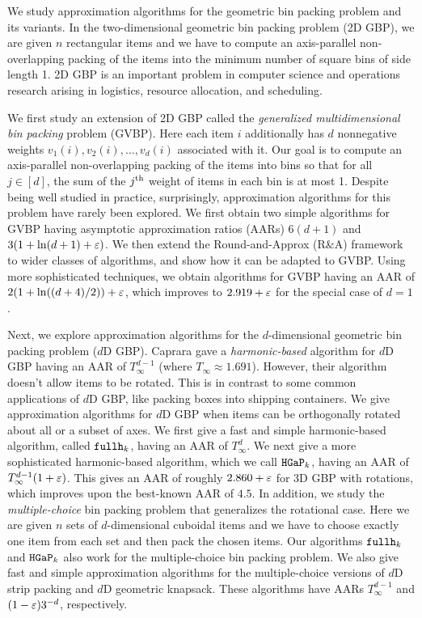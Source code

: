 We study approximation algorithms for
the geometric bin packing problem and its variants.
In the two-dimensional geometric bin packing problem (2D GBP),
we are given $n$ rectangular items and we have to compute
an axis-parallel non-overlapping packing
of the items into the minimum number of square bins of side length 1.
2D GBP is an important problem in computer science and operations research
arising in logistics, resource allocation, and scheduling.

We first study an extension of 2D GBP called the
\emph{generalized multidimensional bin packing} problem (GVBP).
Here each item $i$ additionally has $d$ nonnegative weights
$v_1(i), v_2(i), \ldots, v_d(i)$ associated with it.
Our goal is to compute an axis-parallel non-overlapping packing of the items into bins so that
for all $j \in [d]$, the sum of the $j^{\textrm{th}}$ weight of items in each bin is at most 1.
Despite being well studied in practice, surprisingly,
approximation algorithms for this problem have rarely been explored.
We first obtain two simple algorithms for GVBP having asymptotic approximation ratios (AARs)
$6(d+1)$ and $3(1 + \ln(d+1) + \varepsilon)$.
We then extend the Round-and-Approx (R\&A) framework
to wider classes of algorithms, and show how it can be adapted to GVBP.
Using more sophisticated techniques, we obtain algorithms for GVBP having
an AAR of $2(1+\ln((d+4)/2))+\varepsilon$,
which improves to $2.919+\varepsilon$ for the special case of $d=1$.

Next, we explore approximation algorithms for the $d$-dimensional
geometric bin packing problem ($d$D GBP).
Caprara 
gave a \emph{harmonic-based} algorithm for $d$D GBP having an AAR of
\texorpdfstring{$T_{\infty}^{d-1}$ (where $T_{\infty} \approx 1.691$)}{1.69104^(d-1)}.
However, their algorithm doesn't allow items to be rotated.
This is in contrast to some common applications of $d$D GBP,
like packing boxes into shipping containers.
We give approximation algorithms for $d$D GBP when items can be
orthogonally rotated about all or a subset of axes.
We first give a fast and simple harmonic-based algorithm,
called \texorpdfstring{$\operatorname{\mathtt{fullh}}_{k}$}{fullh\_k}, having an AAR of
\texorpdfstring{$T_{\infty}^{d}$}{1.69104^d}.
We next give a more sophisticated harmonic-based algorithm,
which we call \texorpdfstring{$\operatorname{\mathtt{HGaP}}_{k}$}{hgap\_k},
having an AAR of \texorpdfstring{$T_{\infty}^{d-1}(1+\varepsilon)$}{(1+eps)1.69104^(d-1)}.
This gives an AAR of roughly $2.860 + \varepsilon$ for 3D GBP with rotations,
which improves upon the best-known AAR of $4.5$.
In addition, we study the \emph{multiple-choice} bin packing problem
that generalizes the rotational case.
Here we are given $n$ sets of $d$-dimensional cuboidal items and we have to
choose exactly one item from each set and then pack the chosen items.
Our algorithms \texorpdfstring{$\operatorname{\mathtt{fullh}}_{k}$}{fullh\_k} and \texorpdfstring{$\operatorname{\mathtt{HGaP}}_{k}$}{hgap\_k}
also work for the multiple-choice bin packing problem.
We also give fast and simple approximation algorithms for the multiple-choice
versions of $d$D strip packing and $d$D geometric knapsack.
These algorithms have AARs
\texorpdfstring{$T_{\infty}^{d-1}$}{1.69104^(d-1)} and $(1-\varepsilon)3^{-d}$, respectively.

